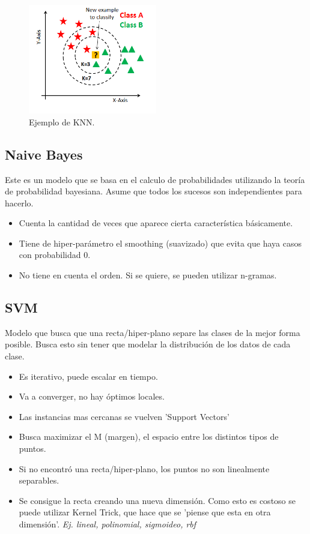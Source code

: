 \documentclass[titlepage,a4paper]{article}
\begin{document}
\begin{figure}[!htb]
    \centering
    \includegraphics[width=0.5\textwidth]{imagenesResumen/KNN.png}
    \caption{Ejemplo de KNN.}
\end{figure}


\subsection{Naive Bayes}
Este es un modelo que se basa en el calculo de probabilidades utilizando la teoría de probabilidad bayesiana. Asume que todos los sucesos son independientes para hacerlo.

\begin{itemize}
    \item Cuenta la cantidad de veces que aparece cierta característica básicamente.
    \item Tiene de hiper-parámetro el smoothing (suavizado) que evita que haya casos con probabilidad 0.
    \item No tiene en cuenta el orden. Si se quiere, se pueden utilizar n-gramas.
    
\end{itemize}

\newpage

\subsection{SVM}

Modelo que busca que una recta/hiper-plano separe las clases de la mejor forma posible. Busca esto sin tener que modelar la distribución de los datos de cada clase.

\begin{itemize}
    \item Es iterativo, puede escalar en tiempo.
    \item Va a converger, no hay óptimos locales.
    \item Las instancias mas cercanas se vuelven 'Support Vectors'
    \item Busca maximizar el M (margen), el espacio entre los distintos tipos de puntos.
    \item Si no encontró una recta/hiper-plano, los puntos no son linealmente separables.
    \item Se consigue la recta creando una nueva dimensión. Como esto es costoso se puede utilizar Kernel Trick, que hace que se 'piense que esta en otra dimensión'. \textit{Ej. lineal, polinomial, sigmoideo, rbf}
\end{itemize}
\end{document}
